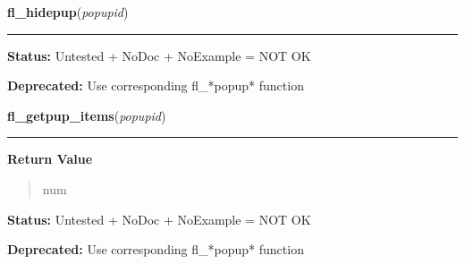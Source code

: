     \label{xformslib:deprecated:fl_hidepup}

    \vspace{0.5ex}

\hspace{.8\funcindent}\begin{boxedminipage}{\funcwidth}

    \raggedright \textbf{fl\_hidepup}(\textit{popupid})

    \vspace{-1.5ex}

    \rule{\textwidth}{0.5\fboxrule}
\setlength{\parskip}{2ex}
\setlength{\parskip}{1ex}
\textbf{Status:} Untested + NoDoc + NoExample = NOT OK



\textbf{Deprecated:} Use corresponding fl\_*popup* function



    \end{boxedminipage}

    \label{xformslib:deprecated:fl_getpup_items}

    \vspace{0.5ex}

\hspace{.8\funcindent}\begin{boxedminipage}{\funcwidth}

    \raggedright \textbf{fl\_getpup\_items}(\textit{popupid})

    \vspace{-1.5ex}

    \rule{\textwidth}{0.5\fboxrule}
\setlength{\parskip}{2ex}
\setlength{\parskip}{1ex}
      \textbf{Return Value}
    \vspace{-1ex}

      \begin{quote}
      num

      \end{quote}

\textbf{Status:} Untested + NoDoc + NoExample = NOT OK



\textbf{Deprecated:} Use corresponding fl\_*popup* function



    \end{boxedminipage}

